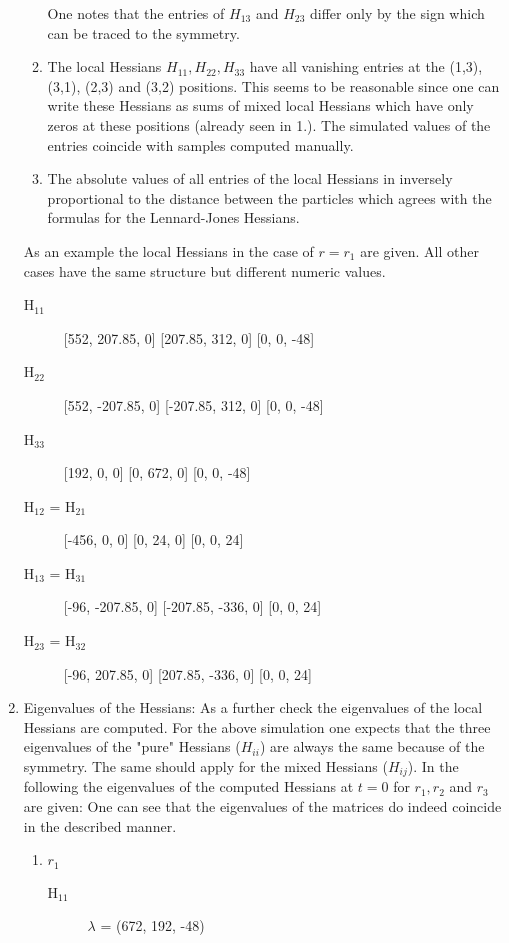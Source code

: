 \documentclass[a4paper]{article}
\begin{document}
\begin{enumerate}
\begin{enumerate}
One notes that the entries of \(H_{13}\) and \(H_{23}\) differ only by the sign which can be traced to the symmetry.
\item The local Hessians \(H_{11}, H_{22}, H_{33}\) have all vanishing entries at the (1,3), (3,1), (2,3) and (3,2) positions.
This seems to be reasonable since one can write these Hessians as sums of mixed local Hessians which have only zeros at these positions (already seen in 1.).
The simulated values of the entries coincide with samples computed manually.
\item The absolute values of all entries of the local Hessians in inversely proportional to the distance between the particles which agrees with the formulas for the Lennard-Jones Hessians.
\end{enumerate}
As an example the local Hessians in the case of \(r = r_1\) are given. All other cases have the same structure but different numeric values.
\begin{description}
\item[{H$_{\text{11}}$}] [552, 207.85, 0]
[207.85, 312, 0]
[0, 0, -48]
\item[{H$_{\text{22}}$}] [552, -207.85, 0]
[-207.85, 312, 0]
[0, 0, -48]
\item[{H$_{\text{33}}$}] [192, 0, 0]
[0, 672, 0]
[0, 0, -48]
\item[{H$_{\text{12}}$ = H$_{\text{21}}$}] [-456, 0, 0]
[0, 24, 0]
[0, 0, 24]
\item[{H$_{\text{13}}$ = H$_{\text{31}}$}] [-96, -207.85, 0]
[-207.85, -336, 0]
[0, 0, 24]
\item[{H$_{\text{23}}$ = H$_{\text{32}}$}] [-96, 207.85, 0]
[207.85, -336, 0]
[0, 0, 24]
\end{description}
\item Eigenvalues of the Hessians:
\label{sec-1-5-1-3}
As a further check the eigenvalues of the local Hessians are computed. For the above simulation one expects that the three eigenvalues of the "pure" Hessians (\(H_{ii}\)) are always the same because of the symmetry. The same should apply for the mixed Hessians (\(H_{ij}\)).
In the following the eigenvalues of the computed Hessians at \(t = 0\) for \(r_1, r_2\) and \(r_3\) are given:
One can see that the eigenvalues of the matrices do indeed coincide in the described manner.
\begin{enumerate}
\item \(r_1\)
\label{sec-1-5-1-3-1}
\begin{description}
\item[{H$_{\text{11}}$}] $\lambda$ = (672, 192, -48)

\end{description}
\end{enumerate}
\end{enumerate}
\end{document}
